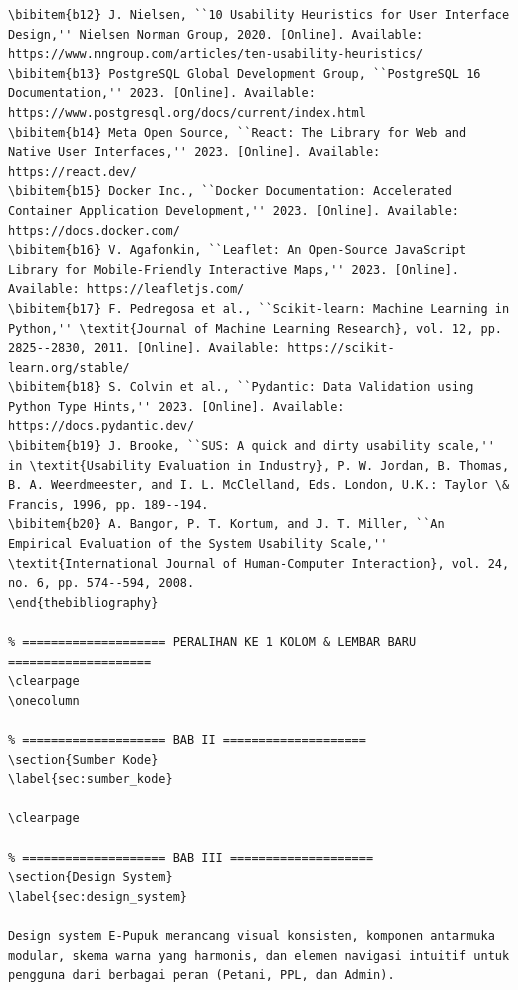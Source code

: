 \documentclass[conference]{IEEEtran}
\begin{document}
\begin{lstlisting}
\bibitem{b12} J. Nielsen, ``10 Usability Heuristics for User Interface Design,'' Nielsen Norman Group, 2020. [Online]. Available: https://www.nngroup.com/articles/ten-usability-heuristics/
\bibitem{b13} PostgreSQL Global Development Group, ``PostgreSQL 16 Documentation,'' 2023. [Online]. Available: https://www.postgresql.org/docs/current/index.html
\bibitem{b14} Meta Open Source, ``React: The Library for Web and Native User Interfaces,'' 2023. [Online]. Available: https://react.dev/
\bibitem{b15} Docker Inc., ``Docker Documentation: Accelerated Container Application Development,'' 2023. [Online]. Available: https://docs.docker.com/
\bibitem{b16} V. Agafonkin, ``Leaflet: An Open-Source JavaScript Library for Mobile-Friendly Interactive Maps,'' 2023. [Online]. Available: https://leafletjs.com/
\bibitem{b17} F. Pedregosa et al., ``Scikit-learn: Machine Learning in Python,'' \textit{Journal of Machine Learning Research}, vol. 12, pp. 2825--2830, 2011. [Online]. Available: https://scikit-learn.org/stable/
\bibitem{b18} S. Colvin et al., ``Pydantic: Data Validation using Python Type Hints,'' 2023. [Online]. Available: https://docs.pydantic.dev/
\bibitem{b19} J. Brooke, ``SUS: A quick and dirty usability scale,'' in \textit{Usability Evaluation in Industry}, P. W. Jordan, B. Thomas, B. A. Weerdmeester, and I. L. McClelland, Eds. London, U.K.: Taylor \& Francis, 1996, pp. 189--194.
\bibitem{b20} A. Bangor, P. T. Kortum, and J. T. Miller, ``An Empirical Evaluation of the System Usability Scale,'' \textit{International Journal of Human-Computer Interaction}, vol. 24, no. 6, pp. 574--594, 2008.
\end{thebibliography}

% ==================== PERALIHAN KE 1 KOLOM & LEMBAR BARU ====================
\clearpage
\onecolumn

% ==================== BAB II ====================
\section{Sumber Kode}
\label{sec:sumber_kode}

\clearpage

% ==================== BAB III ====================
\section{Design System}
\label{sec:design_system}

Design system E-Pupuk merancang visual konsisten, komponen antarmuka modular, skema warna yang harmonis, dan elemen navigasi intuitif untuk pengguna dari berbagai peran (Petani, PPL, dan Admin).


\end{lstlisting}
\end{document}
